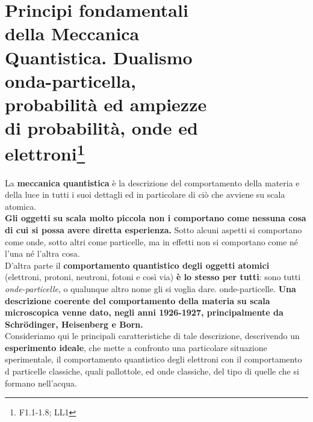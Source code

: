 \chapter[Principi fondamentali della M.Q.]{Principi fondamentali\\ della Meccanica \\ Quantistica. Dualismo\\ onda-particella,\\ probabilità ed ampiezze\\ di probabilità, onde ed\\ elettroni\footnote{F1.1-1.8; LL1}}
La \textbf{meccanica quantistica} è la descrizione del comportamento della materia e della luce in tutti i suoi dettagli ed in particolare di ciò che avviene su scala atomica.\\
\textbf{Gli oggetti su scala molto piccola non i comportano come nessuna cosa di cui si possa avere diretta esperienza.} Sotto alcuni aspetti si comportano come onde, sotto altri come particelle, ma in effetti non si comportano come né l'una né l'altra cosa.\\
D'altra parte il \textbf{comportamento quantistico degli oggetti atomici} (elettroni, protoni, neutroni, fotoni e così via) \textbf{è lo stesso per tutti}: sono tutti \textit{onde-particelle}, o qualunque altro nome gli si voglia dare. onde-particelle. \textbf{Una descrizione coerente del comportamento della materia su scala microscopica venne dato, negli anni 1926-1927, principalmente da Schr\"{o}dinger, Heisenberg e Born.}\\
Consideriamo qui le principali caratteristiche di tale descrizione, descrivendo un \textbf{esperimento ideale}, che mette a confronto una particolare situazione sperimentale, il comportamento quantistico degli elettroni con il comportamento d particelle classiche, quali pallottole, ed onde classiche, del tipo di quelle che si formano nell'acqua.
\newpage

